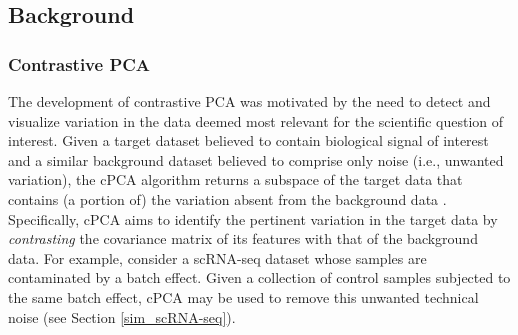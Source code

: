 \subsection{Background}\label{back}


\subsubsection{Contrastive PCA}\label{cpca}

The development of contrastive PCA was motivated by the need to detect and visualize variation in the data deemed most relevant for the scientific question of interest. Given a target dataset believed to contain biological signal of interest and a similar background dataset believed to comprise only noise (i.e., unwanted variation), the cPCA algorithm returns a subspace of the target data that contains (a portion of) the variation absent from the background data \citep{Abid2018}. Specifically, cPCA aims to identify the pertinent variation in the target data by \textit{contrasting} the covariance matrix of its features with that of the background data. For example, consider a scRNA-seq dataset whose samples are contaminated by a batch effect. Given a collection of control samples subjected to the same batch effect, cPCA may be used to remove this unwanted technical noise (see Section \ref{sim_scRNA-seq}).

